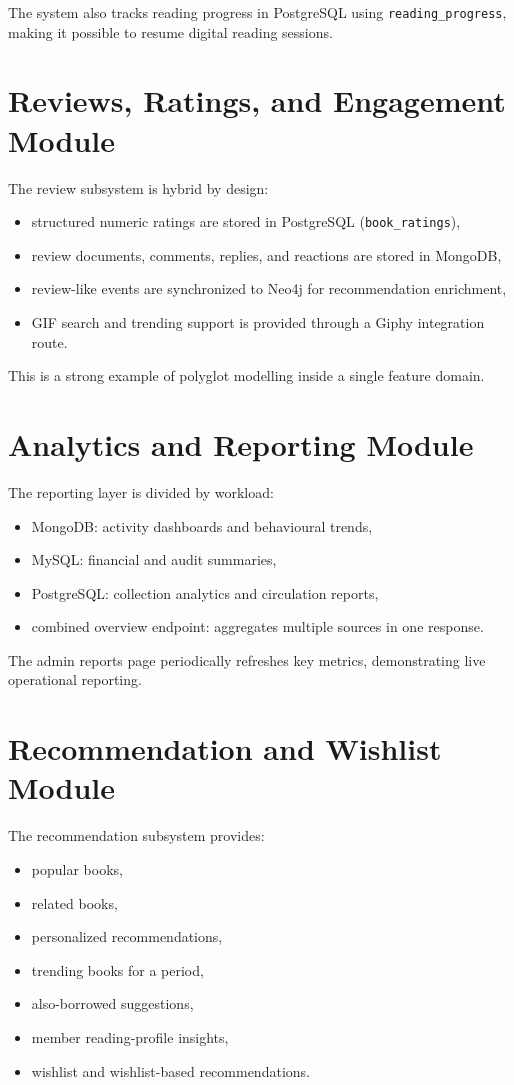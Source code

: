 \documentclass[12pt,a4paper]{report}
\begin{document}
The system also tracks reading progress in PostgreSQL using \texttt{reading\_progress}, making it possible to resume digital reading sessions.

\section{Reviews, Ratings, and Engagement Module}
The review subsystem is hybrid by design:
\begin{itemize}[leftmargin=1.5em]
    \item structured numeric ratings are stored in PostgreSQL (\texttt{book\_ratings}),
    \item review documents, comments, replies, and reactions are stored in MongoDB,
    \item review-like events are synchronized to Neo4j for recommendation enrichment,
    \item GIF search and trending support is provided through a Giphy integration route.
\end{itemize}

This is a strong example of polyglot modelling inside a single feature domain.

\section{Analytics and Reporting Module}
The reporting layer is divided by workload:
\begin{itemize}[leftmargin=1.5em]
    \item MongoDB: activity dashboards and behavioural trends,
    \item MySQL: financial and audit summaries,
    \item PostgreSQL: collection analytics and circulation reports,
    \item combined overview endpoint: aggregates multiple sources in one response.
\end{itemize}

The admin reports page periodically refreshes key metrics, demonstrating live operational reporting.

\section{Recommendation and Wishlist Module}
The recommendation subsystem provides:
\begin{itemize}[leftmargin=1.5em]
    \item popular books,
    \item related books,
    \item personalized recommendations,
    \item trending books for a period,
    \item also-borrowed suggestions,
    \item member reading-profile insights,
    \item wishlist and wishlist-based recommendations.
\end{itemize}
\end{document}

